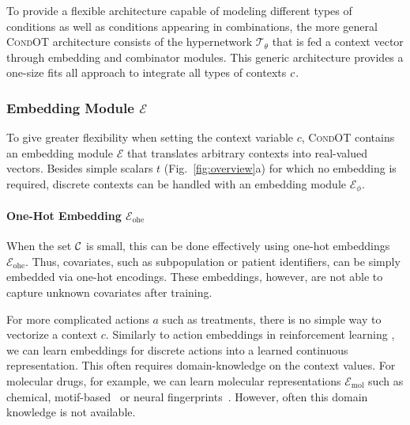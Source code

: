 To provide a flexible architecture capable of modeling different types of conditions as well as conditions appearing in combinations, the more general \textsc{CondOT} architecture consists of the hypernetwork $\mathcal{T}_\theta$ that is fed a context vector through embedding and combinator modules. This generic architecture provides a one-size fits all approach to integrate all types of contexts $c$.

\subsubsection{Embedding Module $\mathcal{E}$}
To give greater flexibility when setting the context variable $c$, \textsc{CondOT} contains an embedding module $\mathcal{E}$ that translates arbitrary contexts into real-valued vectors. Besides simple scalars $t$ (Fig.~\ref{fig:overview}a) for which no embedding is required, discrete contexts can be handled with an embedding module $\mathcal{E}_\phi$.

\paragraph{One-Hot Embedding $\mathcal{E}_\text{ohe}$}
When the set ${\mathcal{C}}$ is small, this can be done effectively using one-hot embeddings $\mathcal{E}_\text{ohe}$.
Thus, covariates, such as subpopulation or patient identifiers, can be simply embedded via one-hot encodings. These embeddings, however, are not able to capture unknown covariates after training.

For more complicated actions $a$ such as treatments, there is no simple way to vectorize a context $c$. Similarly to action embeddings in reinforcement learning \citep{chandak2019learning, tennenholtz2019natural}, we can learn embeddings for discrete actions into a learned continuous representation.
This often requires domain-knowledge on the context values. For molecular drugs, for example, we can learn molecular representations $\mathcal{E}_\text{mol}$ such as chemical, motif-based~\citep{rogers2010extended} or neural fingerprints~\citep{rong2020grover, schwaller2022machine, rogers2010extended}.
However, often this domain knowledge is not available. 

